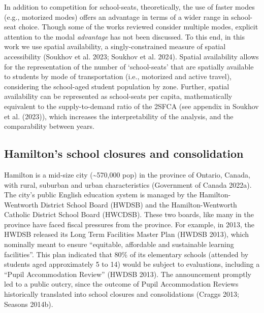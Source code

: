 \documentclass[
default
]{sn-jnl}
\begin{document}
In addition to competition for school-seats, theoretically, the use of
faster modes (e.g., motorized modes) offers an advantage in terms of a
wider range in school-seat choice. Though some of the works reviewed
consider multiple modes, explicit attention to the modal
\emph{advantage} has not been discussed. To this end, in this work we
use spatial availability, a singly-constrained measure of spatial
accessibility (Soukhov et al. 2023; Soukhov et al. 2024). Spatial
availability allows for the representation of the number of
`school-seats' that are spatially available to students by mode of
transportation (i.e., motorized and active travel), considering the
school-aged student population by zone. Further, spatial availability
can be represented as school-seats per capita, mathematically equivalent
to the supply-to-demand ratio of the 2SFCA (see appendix in Soukhov et
al. (2023)), which increases the interpretability of the analysis, and
the comparability between years.

\subsection{Hamilton's school closures and
consolidation}\label{hamiltons-school-closures-and-consolidation}

Hamilton is a mid-size city (\textasciitilde570,000 pop) in the province
of Ontario, Canada, with rural, suburban and urban characteristics
(Government of Canada 2022a). The city's public English education system
is managed by the Hamilton-Wentworth District School Board (HWDSB) and
the Hamilton-Wentworth Catholic District School Board (HWCDSB). These
two boards, like many in the province have faced fiscal pressures from
the province. For example, in 2013, the HWDSB released its Long Term
Facilities Master Plan (HWDSB 2013), which nominally meant to ensure
``equitable, affordable and sustainable learning facilities''. This plan
indicated that 80\% of its elementary schools (attended by students aged
approximately 5 to 14) would be subject to evaluations, including a
``Pupil Accommodation Review'' (HWDSB 2013). The announcement promptly
led to a public outcry, since the outcome of Pupil Accommodation Reviews
historically translated into school closures and consolidations (Craggs
2013; Seasons 2014b).
\end{document}
